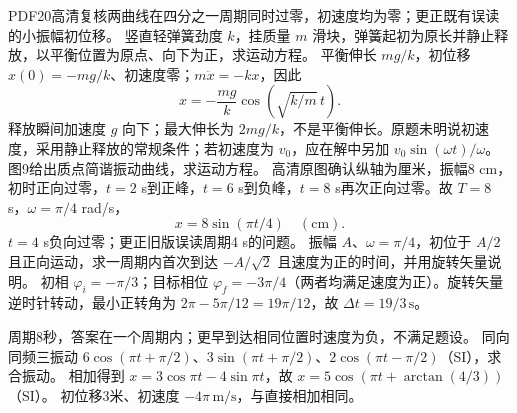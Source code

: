 \crosscheck PDF20高清复核两曲线在四分之一周期同时过零，初速度均为零；更正既有误读的小振幅初位移。
\problemtext 竖直轻弹簧劲度 $k$，挂质量 $m$ 滑块，弹簧起初为原长并静止释放，以平衡位置为原点、向下为正，求运动方程。
\workings 平衡伸长 $mg/k$，初位移 $x(0)=-mg/k$、初速度零；$m\ddot x=-kx$，因此
\[
x=-\frac{mg}{k}\cos(\sqrt{k/m}\,t).
\]
\crosscheck 释放瞬间加速度 $g$ 向下；最大伸长为 $2mg/k$，不是平衡伸长。原题未明说初速度，采用静止释放的常规条件；若初速度为 $v_0$，应在解中另加 $v_0\sin(\omega t)/\omega$。
\problemtext 图9给出质点简谐振动曲线，求运动方程。
\workings 高清原图确认纵轴为厘米，振幅8 cm，初时正向过零，$t=2$ s到正峰，$t=6$ s到负峰，$t=8$ s再次正向过零。故 $T=8$ s，$\omega=\pi/4$ rad/s，
\[
x=8\sin(\pi t/4)\quad(\mathrm{cm}).
\]
\crosscheck $t=4$ s负向过零；更正旧版误读周期4 s的问题。
\problemtext 振幅 $A$、$\omega=\pi/4$，初位于 $A/2$ 且正向运动，求一周期内首次到达 $-A/\sqrt2$ 且速度为正的时间，并用旋转矢量说明。
\workings 初相 $\varphi_i=-\pi/3$；目标相位 $\varphi_f=-3\pi/4$（两者均满足速度为正）。旋转矢量逆时针转动，最小正转角为 $2\pi-5\pi/12=19\pi/12$，故 $\Delta t=19/3\,\mathrm s$。
\begin{center}
\end{center}
\crosscheck 周期8秒，答案在一个周期内；更早到达相同位置时速度为负，不满足题设。
\problemtext 同向同频三振动 $6\cos(\pi t+\pi/2)$、$3\sin(\pi t+\pi/2)$、$2\cos(\pi t-\pi/2)$（SI），求合振动。
\workings 相加得到 $x=3\cos\pi t-4\sin\pi t$，故 $x=5\cos(\pi t+\arctan(4/3))$（SI）。
\crosscheck 初位移3米、初速度 $-4\pi\,\mathrm{m/s}$，与直接相加相同。
